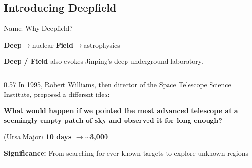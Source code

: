 \subsection{Introducing Deepfield}
\setsource{}
\begin{frame}[c,label=md-1]
\end{frame}

\begin{frame}[t,label=md-3]{Name: Why Deepfield?}
\small
\raggedright
{\large\bfseries{}Deep}\enspace$\rightarrow$\enspace nuclear
\hspace{0.8cm}
{\large\bfseries{}Field}\enspace$\rightarrow$\enspace astrophysics
\par\vspace{0.30cm}
{\large\bfseries{}Deep / Field}
also evokes Jinping's {\color{blue}deep underground} laboratory.\par

\vspace{0.2cm}
\begin{columns}[T,onlytextwidth]
\begin{column}{0.57\textwidth}
    \small
    \justifying
    \setlength{\parskip}{0pt}
    {}
    \vspace{0.10cm}
    In 1995, Robert Williams, then director of the Space Telescope Science Institute, proposed a different idea:
    \par\vspace{0.1cm}
    {\bfseries What would happen
    if we pointed the most advanced telescope at a seemingly empty patch of sky and observed it for long enough?\par}
    \vspace{0.16cm}
    (Ursa Major)
    {\bfseries\boldmath\color{blue}10 days
    $\longrightarrow$\enspace$\sim$3,000}%
    \par
    \vspace{0.14cm}
    {\color{black}
    \textbf{Significance:}
    From searching for ever-known targets to explore unknown regions------

}
\end{column}
\end{columns}
\end{frame}
